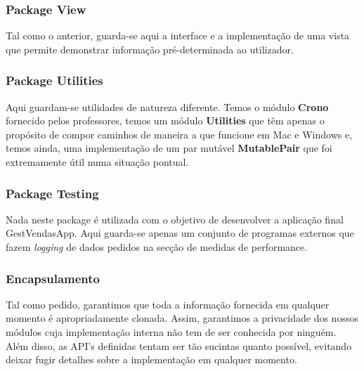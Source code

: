 \documentclass[11pt]{article}
\begin{document}
\subsubsection{Package View}
Tal como o anterior, guarda-se aqui a interface e a implementação de uma vista que permite demonstrar informação pré-determinada ao utilizador.

\subsubsection{Package Utilities}
Aqui guardam-se utilidades de natureza diferente. Temos o módulo \textbf{Crono} fornecido pelos professores, temos um módulo \textbf{Utilities} que têm apenas o propósito de compor caminhos de maneira a que funcione em Mac e Windows e, temos ainda, uma implementação de um par mutável \textbf{MutablePair} que foi extremamente útil numa situação pontual.

\subsubsection{Package Testing}
Nada neste package é utilizada com o objetivo de desenvolver a aplicação final GestVendasApp. Aqui guarda-se apenas um conjunto de programas externos que fazem \textit{logging} de dados pedidos na secção de medidas de performance.

\subsubsection{Encapsulamento}
Tal como pedido, garantimos que toda a informação fornecida em qualquer momento é apropriadamente clonada. Assim, garantimos a privacidade dos nossos módulos cuja implementação interna não tem de ser conhecida por ninguém. Além disso, as API's definidas tentam ser tão sucintas quanto possível, evitando deixar fugir detalhes sobre a implementação em qualquer momento.

\newpage
\end{document}

